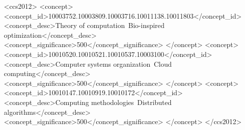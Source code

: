 \documentclass[sigconf]{acmart}
\begin{document}
%
%
\begin{CCSXML}
  <ccs2012>
  <concept>
  <concept_id>10003752.10003809.10003716.10011138.10011803</concept_id>
  <concept_desc>Theory of computation~Bio-inspired optimization</concept_desc>
  <concept_significance>500</concept_significance>
  </concept>
  <concept>
  <concept_id>10010520.10010521.10010537.10003100</concept_id>
  <concept_desc>Computer systems organization~Cloud computing</concept_desc>
  <concept_significance>500</concept_significance>
  </concept>
  <concept>
  <concept_id>10010147.10010919.10010172</concept_id>
  <concept_desc>Computing methodologies~Distributed algorithms</concept_desc>
  <concept_significance>500</concept_significance>
  </concept>
  </ccs2012>
\end{CCSXML}
  



\maketitle




 
\end{document}
